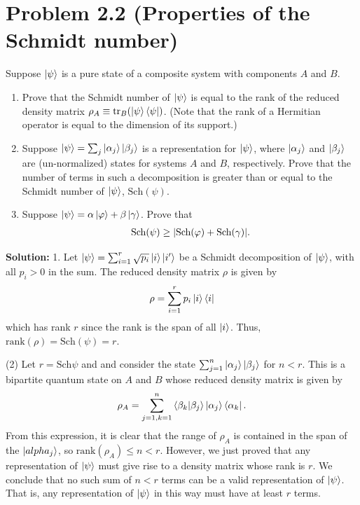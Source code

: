 \documentclass{book}
\begin{document}
\section*{Problem 2.2 (Properties of the Schmidt number)}
    Suppose $\ket{\psi}$ is a pure state of a composite system with components $A$ and $B$. 
    \begin{enumerate}
        \item Prove that the Schmidt number of $\ket{\psi}$ is equal to the rank of the reduced density matrix $\rho_A \equiv \tr_B(\ket{\psi}\bra{\psi})$. (Note that the rank of a Hermitian operator is equal to the dimension of its support.)
        \item Suppose $\ket{\psi} = \sum_j \ket{\alpha_j}\ket{\beta_j}$ is a representation for $\ket{\psi}$, where $\ket{\alpha_j}$ and $\ket{\beta_j}$ are (un-normalized) states for systems $A$ and $B$, respectively. Prove that the number of terms in such a decomposition is greater than or equal to the Schmidt number of $\ket{\psi}$, $\text{Sch}(\psi)$.
        \item Suppose $\ket{\psi} = \alpha \ket{\varphi} + \beta \ket{\gamma}$. Prove that
        \begin{align}
            \text{Sch}(\psi) \geq \abs{\text{Sch}(\varphi)+\text{Sch}(\gamma)}.
        \end{align}
    \end{enumerate}

    \textbf{Solution:} 1. Let $\ket{\psi} = \sum_{i=1}^r \sqrt{p_i} \ket{i}\ket{i'}$ be a Schmidt decomposition of $\ket{\psi}$, with all $p_i > 0$ in the sum. The reduced density matrix $\rho$ is given by 
    \begin{align}
        \rho = \sum_{i=1}^r p_i \ket{i}\bra{i}
    \end{align}
    which has rank $r$ since the rank is the span of all $\ket{i}$. Thus, $\text{rank}(\rho) = \text{Sch}(\psi) = r$.

    (2) Let $r = \text{Sch}{\psi}$ and and consider the state $\sum_{j=1}^n \ket{\alpha_j}\ket{\beta_j}$ for $n < r$. This is a bipartite quantum state on $A$ and $B$ whose reduced density matrix is given by
    \begin{align}
        \rho_A = \sum_{j=1, k=1}^n \bra{\beta_k}\ket{\beta_j} \ket{\alpha_j}\bra{\alpha_k}.
    \end{align}
    From this expression, it is clear that the range of $\rho_A$ is contained in the span of the $\ket{alpha_j}$, so $\text{rank}(\rho_A) \leq n < r$. However, we just proved that any representation of $\ket{\psi}$ must give rise to a density matrix whose rank is $r$. We conclude that no such sum of $n < r$ terms can be a valid representation of $\ket{\psi}$. That is, any representation of $\ket{\psi}$ in this way must have at least $r$ terms. 
\end{document}
